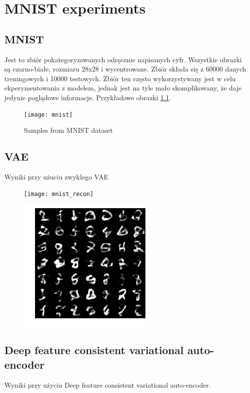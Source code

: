 \chapter{MNIST experiments}

\section{MNIST}

Jest to zbiór pokategoryzowanych odręcznie napisanych cyfr. Wszystkie obrazki są czarno-białe, rozmiaru 28x28 i wycentrowane. Zbiór składa się z 60000 danych treningowych i 10000 testowych. Zbiór ten często wykorzystywany jest w celu ekperymentowania z modelem, jednak jest na tyle mało skomplikowany, że daje jedynie poglądowe informacje. Przykładowe obrazki \ref{fig:mnist}.

\begin{figure}[h]
    \centering
    \texttt{[image: mnist]}
    \caption{Samples from MNIST dataset}
    \label{fig:mnist}
\end{figure}

\section{VAE}

Wyniki przy użuciu zwykłego VAE

\begin{figure}[h]
    \centering
    \texttt{[image: mnist\_recon]}
    \caption{}
    \label{fig:mnist_recon}
\end{figure}

\begin{figure}[h]
    \centering
    \includegraphics[width=0.6\textwidth]{images/mnist_gen.png}
    \caption{}
    \label{fig:mnist_gen}
\end{figure}

\section{Deep feature consistent variational auto-encoder}

Wyniki przy użyciu Deep feature consistent variational auto-encoder.
